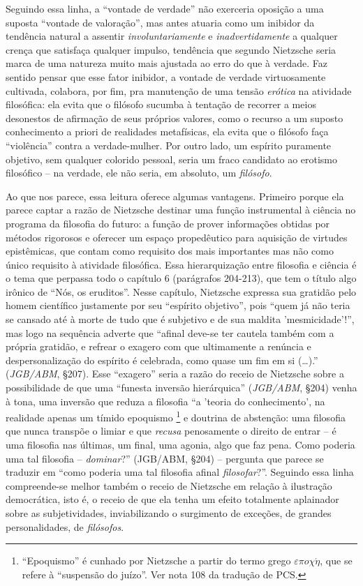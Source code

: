 \documentclass[
	12pt,				%
	openright,			%
	oneside,			%
	a4paper,			%
	english,			%
	french,				%
	spanish,			%
	brazil				%
	]{abntex2}
\begin{document}
Seguindo essa linha, a “vontade de verdade” não exerceria oposição a uma suposta “vontade de valoração”, mas antes atuaria como um inibidor da tendência natural a assentir \textit{involuntariamente} e \textit{inadvertidamente} a qualquer crença que satisfaça qualquer impulso, tendência que segundo Nietzsche seria marca de uma natureza muito mais ajustada ao erro do que à verdade. Faz sentido pensar que esse fator inibidor, a vontade de verdade virtuosamente cultivada, colabora, por fim, pra manutenção de uma tensão \textit{erótica} na atividade filosófica: ela evita que o filósofo sucumba à tentação de recorrer a meios desonestos de afirmação de seus próprios valores, como o recurso a um suposto conhecimento a priori de realidades metafísicas, ela evita que o filósofo faça “violência” contra a verdade-mulher. Por outro lado, um espírito puramente objetivo, sem qualquer colorido pessoal, seria um fraco candidato ao erotismo filosófico – na verdade, ele não seria, em absoluto, um \textit{filósofo}. 

Ao que nos parece, essa leitura oferece algumas vantagens. Primeiro porque ela parece captar a razão de Nietzsche destinar uma função instrumental à ciência no programa da filosofia do futuro: a função de prover informações obtidas por métodos rigorosos e oferecer um espaço propedêutico para aquisição de virtudes epistêmicas, que contam como requisito dos mais importantes mas não como único requisito à atividade filosófica. Essa hierarquização entre filosofia e ciência é o tema que perpassa todo o capítulo 6 (parágrafos 204-213), que tem o título algo irônico de “Nós, os eruditos”. Nesse capítulo, Nietzsche expressa sua gratidão pelo homem científico justamente por seu “espírito objetivo”, pois “quem já não teria se cansado até à morte de tudo que é subjetivo e de sua maldita 'mesmicidade'!”, mas logo na sequência adverte que “afinal deve-se ter cautela também com a própria gratidão, e refrear o exagero com que ultimamente a renúncia e despersonalização do espírito é celebrada, como quase um fim em si (…).” (\textit{JGB/ABM}, §207). Esse “exagero” seria a razão do receio de Nietzsche sobre a possibilidade de que uma “funesta inversão hierárquica” (\textit{JGB/ABM}, §204) venha à tona, uma inversão que reduza a filosofia “a 'teoria do conhecimento', na realidade apenas um tímido epoquismo
\footnote{“Epoquismo” é cunhado por Nietzsche a partir do termo grego $\varepsilon\pi{o}\chi\acute{\eta}$, que se refere à “suspensão do juízo”. Ver nota 108 da tradução de PCS.} 
e doutrina de abstenção: uma filosofia que nunca transpõe o limiar e que \textit{recusa} penosamente o direito de entrar – é uma filosofia nas últimas, um final, uma agonia, algo que faz pena. Como poderia uma tal filosofia – \textit{dominar}?” (JGB/ABM, §204) – pergunta que parece se traduzir em “como poderia uma tal filosofia afinal \textit{filosofar}?”. Seguindo essa linha compreende-se melhor também o receio de Nietzsche em relação à ilustração democrática, isto é, o receio de que ela tenha um efeito totalmente aplainador sobre as subjetividades, inviabilizando o surgimento de exceções, de grandes personalidades, de \textit{filósofos}.
\end{document}

